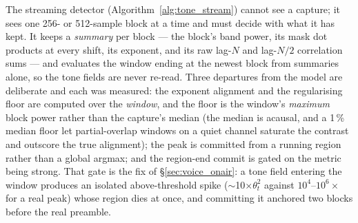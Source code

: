 The streaming detector (Algorithm~\ref{alg:tone_stream}) cannot see a
capture; it sees one 256- or 512-sample block at a time and must
decide with what it has kept.  It keeps a \emph{summary} per block ---
the block's band power, its mask dot products at every shift, its
exponent, and its raw lag-$N$ and lag-$N/2$ correlation sums --- and
evaluates the window ending at the newest block from summaries alone,
so the tone fields are never re-read.  Three departures from the
model are deliberate and each was measured: the exponent alignment
and the regularising floor are computed over the \emph{window}, and
the floor is the window's \emph{maximum} block power rather than the
capture's median (the median is acausal, and a 1\,\% median floor let
partial-overlap windows on a quiet channel saturate the contrast and
outscore the true alignment); the peak is committed from a running
region rather than a global argmax; and the region-end commit is gated
on the metric being strong.  That gate is the fix of
\S\ref{sec:voice_onair}: a tone field entering the window produces an
isolated above-threshold spike ($\sim$10$\times\theta_t^2$ against
$10^4$--$10^6\times$ for a real peak) whose region dies at once, and
committing it anchored two blocks before the real preamble.

